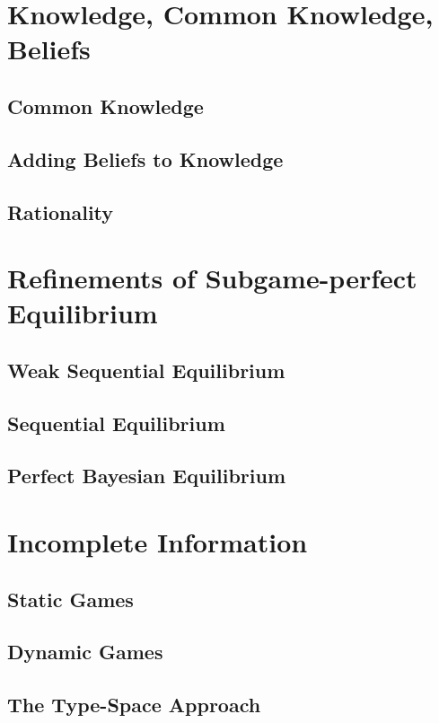 \documentclass[10pt]{book}
\begin{document}
		\chapter{Knowledge, Common Knowledge, Beliefs}
			\section{Common Knowledge}

			\section{Adding Beliefs to Knowledge}

			\section{Rationality}

		\chapter{Refinements of Subgame-perfect Equilibrium}
			\section{Weak Sequential Equilibrium}

			\section{Sequential Equilibrium}

			\section{Perfect Bayesian Equilibrium}

		\chapter{Incomplete Information}
			\section{Static Games}

			\section{Dynamic Games}

			\section{The Type-Space Approach}
\end{document}
